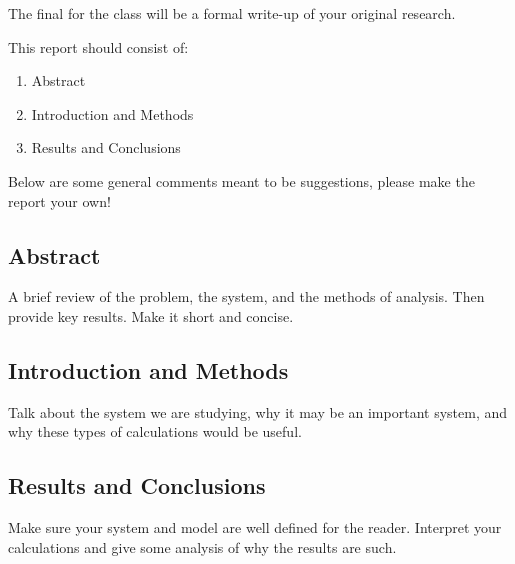 \documentclass{article}
\begin{document}
The final for the class will be a formal write-up of your original research. 

This report should consist of:
\begin{enumerate}
    \item Abstract 
    \item Introduction and Methods
    \item Results and Conclusions
\end{enumerate}
Below are some general comments meant to be suggestions, please make the report your own!

\subsection*{Abstract}
A brief review of the problem, the system, and the methods of analysis. Then provide key results. Make it short and concise.

\subsection*{Introduction and Methods}
Talk about the system we are studying, why it may be an important system, and why these types of calculations would be useful. 

\subsection*{Results and Conclusions}
Make sure your system and model are well defined for the reader.
Interpret your calculations and give some analysis of why the results are such. 
\end{document}
